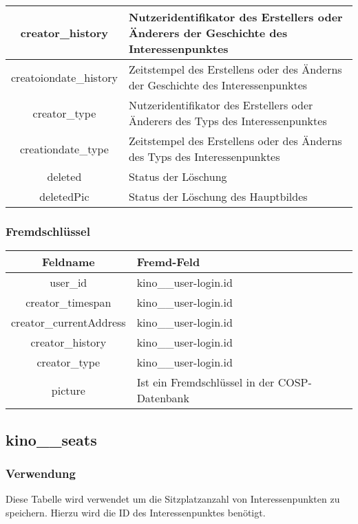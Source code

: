 \begin{longtable}[H]{|c|p{11cm}|}
	creator\_history & Nutzeridentifikator des Erstellers oder Änderers der Geschichte des Interessenpunktes \\ \hline
	creatoiondate\_history & Zeitstempel des Erstellens oder des Änderns der Geschichte des Interessenpunktes \\ \hline
	creator\_type & Nutzeridentifikator des Erstellers oder Änderers des Typs des Interessenpunktes \\ \hline
	creationdate\_type & Zeitstempel des Erstellens oder des Änderns des Typs des Interessenpunktes \\ \hline
	deleted & Status der Löschung \\ \hline
	deletedPic & Status der Löschung des Hauptbildes \\ \hline
\end{longtable}
\subsubsection{Fremdschlüssel}
\begin{table}[H]
	\begin{tabular}{|c|p{12.5cm}|}
		\hline
		\textbf{Feldname} & \textbf{Fremd-Feld} \\ \hline
		user\_id & kino\_\_user-login.id \\ \hline
		creator\_timespan & kino\_\_user-login.id \\ \hline
		creator\_currentAddress & kino\_\_user-login.id \\ \hline
		creator\_history & kino\_\_user-login.id \\ \hline
		creator\_type & kino\_\_user-login.id \\ \hline
		picture & Ist ein Fremdschlüssel in der {\glqq COSP\grqq}-Datenbank \\ \hline
	\end{tabular}
\end{table}
\subsection{kino\_\_seats}
\subsubsection{Verwendung} Diese Tabelle wird verwendet um die Sitzplatzanzahl von Interessenpunkten zu speichern. Hierzu wird die ID des Interessenpunktes benötigt.
